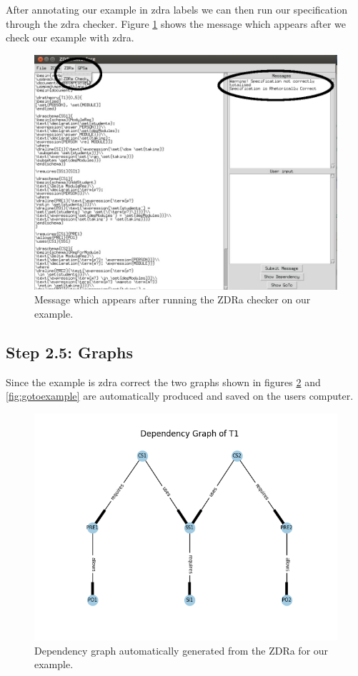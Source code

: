 After annotating our example in \gls{zdra} labels we can then run our
specification through the \gls{zdra} checker. Figure \ref{fig:zdracorrect} shows
the message which appears after we check our example with \gls{zdra}.

\begin{figure}[H]
\centering
\includegraphics[scale=0.3]{Figures/fullexample/zdracorrect.png}
\caption{Message which appears after running the ZDRa checker on our example. \label{fig:zdracorrect}}
\end{figure}

\subsection{Step 2.5: Graphs}

Since the example is \gls{zdra} correct the two graphs shown in figures
\ref{fig:depexample} and \ref{fig:gotoexample} are automatically produced and
saved on the users computer.

\begin{figure}[H]
\centering
\includegraphics[scale=0.7]{Figures/fullexample/dp_fullexample.png}
\caption{Dependency graph automatically generated from the ZDRa for our example. \label{fig:depexample}}
\end{figure}

